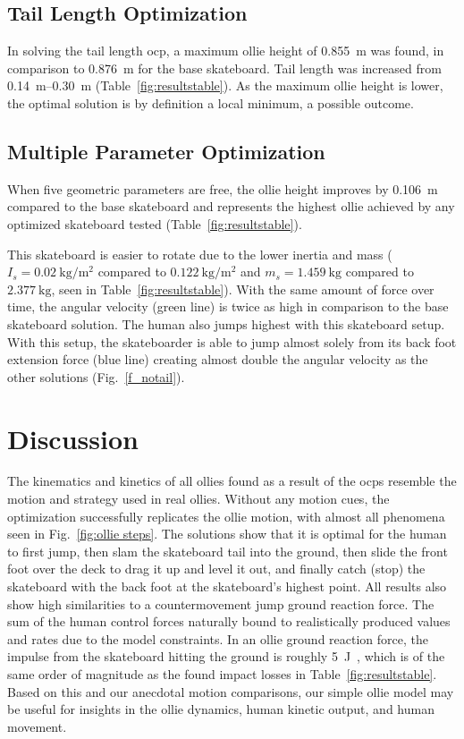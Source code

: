 \documentclass[default,iicol,pdflatex]{sn-jnl}
\begin{document}
\subsection{Tail Length Optimization}
In solving the tail length \gls{ocp}, a maximum ollie height of \SI{0.855}{\meter} was found, in comparison to \SI{0.876}{\meter} for the base skateboard. Tail length was increased from \SIrange{0.14}{0.30}{\meter} (Table~\ref{fig:resultstable}). As the maximum ollie height is lower, the optimal solution is by definition a local minimum, a possible outcome.

\subsection{Multiple Parameter Optimization}
When five geometric parameters are free, the ollie height improves by \SI{0.106}{\meter} compared to the base skateboard and represents the highest ollie achieved by any optimized skateboard tested (Table~\ref{fig:resultstable}). 

This skateboard is easier to rotate due to the lower inertia and mass ($I_s = \SI{0.02}{\kilo\gram\per\meter\squared}$ compared to $\SI{0.122}{\kilo\gram\per\meter\squared}$ and $m_s = \SI{1.459}{\kilo\gram}$ compared to $\SI{2.377}{\kilo\gram}$, seen in Table~\ref{fig:resultstable}).
With the same amount of force over time, the angular velocity (green line) is twice as high in comparison to the base skateboard solution.
The human also jumps highest with this skateboard setup.
With this setup, the skateboarder is able to jump almost solely from its back foot extension force (blue line) creating almost double the angular velocity as the other solutions (Fig.~\ref{f_notail}).

\section{Discussion}
The kinematics and kinetics of all ollies found as a result of the \glspl{ocp} resemble the motion and strategy used in real ollies.
Without any motion cues, the optimization successfully replicates the ollie motion, with almost all phenomena seen in Fig.~\ref{fig:ollie steps}.
The solutions show that it is optimal for the human to first jump, then slam the skateboard tail into the ground, then slide the front foot over the deck to drag it up and level it out, and finally catch (stop) the skateboard with the back foot at the skateboard's highest point.
All results also show high similarities to a countermovement jump ground reaction force.
The sum of the human control forces naturally bound to realistically produced values and rates due to the model constraints.
In an ollie ground reaction force, the impulse from the skateboard hitting the ground is roughly \SI{5}{\joule}~\cite{determan_kinetics_2006}, which is of the same order of magnitude as the found impact losses in Table~\ref{fig:resultstable}.
Based on this and our anecdotal motion comparisons, our simple ollie model may be useful for insights in the ollie dynamics, human kinetic output, and human movement.
\end{document}

